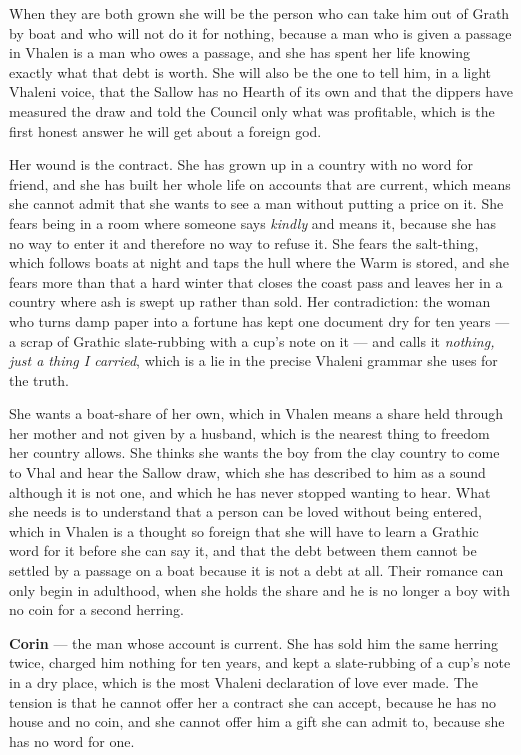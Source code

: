 \documentclass{design/chronicle}
\begin{document}
{When they are both grown she will be the person who can take him out of Grath by boat and who will not do it for nothing, because a man who is given a passage in Vhalen is a man who owes a passage, and she has spent her life knowing exactly what that debt is worth. She will also be the one to tell him, in a light Vhaleni voice, that the Sallow has no Hearth of its own and that the dippers have measured the draw and told the Council only what was profitable, which is the first honest answer he will get about a foreign god.

Her wound is the contract. She has grown up in a country with no word for friend, and she has built her whole life on accounts that are current, which means she cannot admit that she wants to see a man without putting a price on it. She fears being in a room where someone says \emph{kindly} and means it, because she has no way to enter it and therefore no way to refuse it. She fears the salt-thing, which follows boats at night and taps the hull where the Warm is stored, and she fears more than that a hard winter that closes the coast pass and leaves her in a country where ash is swept up rather than sold. Her contradiction: the woman who turns damp paper into a fortune has kept one document dry for ten years — a scrap of Grathic slate-rubbing with a cup’s note on it — and calls it \emph{nothing, just a thing I carried}, which is a lie in the precise Vhaleni grammar she uses for the truth.

She wants a boat-share of her own, which in Vhalen means a share held through her mother and not given by a husband, which is the nearest thing to freedom her country allows. She thinks she wants the boy from the clay country to come to Vhal and hear the Sallow draw, which she has described to him as a sound although it is not one, and which he has never stopped wanting to hear. What she needs is to understand that a person can be loved without being entered, which in Vhalen is a thought so foreign that she will have to learn a Grathic word for it before she can say it, and that the debt between them cannot be settled by a passage on a boat because it is not a debt at all. Their romance can only begin in adulthood, when she holds the share and he is no longer a boy with no coin for a second herring.

\textbf{Corin} — the man whose account is current. She has sold him the same herring twice, charged him nothing for ten years, and kept a slate-rubbing of a cup’s note in a dry place, which is the most Vhaleni declaration of love ever made. The tension is that he cannot offer her a contract she can accept, because he has no house and no coin, and she cannot offer him a gift she can admit to, because she has no word for one.

}
\end{document}
